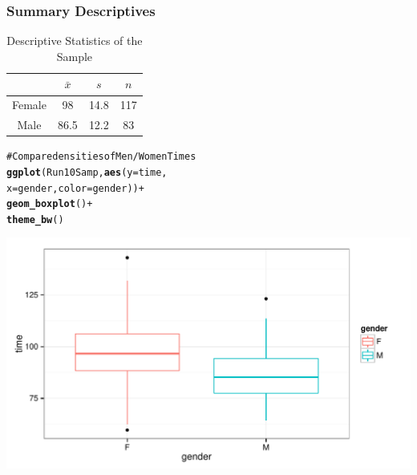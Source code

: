 \documentclass{beamer}\usepackage{graphicx, color}
\makeatletter
\def\maxwidth{ %
  \ifdim\Gin@nat@width>\linewidth
    \linewidth
  \else
    \Gin@nat@width
  \fi
}
\newcommand{\hlfunctioncall}[1]{\textcolor[rgb]{0.501960784313725,0,0.329411764705882}{\textbf{#1}}}%
\newcommand{\hlcomment}[1]{\textcolor[rgb]{0.180392156862745,0.6,0.341176470588235}{#1}}%
\newenvironment{kframe}{%
 \def\at@end@of@kframe{}%
 \ifinner\ifhmode%
  \def\at@end@of@kframe{\end{minipage}}%
  \begin{minipage}{\columnwidth}%
 \fi\fi%
 \def\FrameCommand##1{\hskip\@totalleftmargin \hskip-\fboxsep
 \colorbox{shadecolor}{##1}\hskip-\fboxsep
     \hskip-\linewidth \hskip-\@totalleftmargin \hskip\columnwidth}%
 \MakeFramed {\advance\hsize-\width
   \@totalleftmargin\z@ \linewidth\hsize
   \@setminipage}}%
 {\par\unskip\endMakeFramed%
 \at@end@of@kframe}
\newenvironment{knitrout}{}{} %
\makeatother
\begin{document}
\begin{frame}[fragile]
  \frametitle{Summary Descriptives}


  
  \begin{table}
  \caption{Descriptive Statistics of the Sample}
  \begin{tabular}{c | c c c}
  & $\bar{x}$ & $s$ & $n$ \\
  \hline\hline
  Female & 98 & 14.8 & 117 \\
  Male & 86.5 & 12.2 & 83 \\
  \hline
  
  \end{tabular}
  \end{table}
\end{frame}

\begin{frame}
\begin{knitrout}
\color{fgcolor}\begin{kframe}
\begin{alltt}
\hlcomment{# Compare densities of Men/Women Times}
\hlfunctioncall{ggplot}(Run10Samp, \hlfunctioncall{aes}(y = time, 
                      x = gender, color = gender)) +
        \hlfunctioncall{geom_boxplot}() +
        \hlfunctioncall{theme_bw}()
\end{alltt}
\end{kframe}

{\centering \includegraphics[width=\maxwidth]{figure/GenderDist} 

}


\end{knitrout}

\end{frame}

\end{document}
